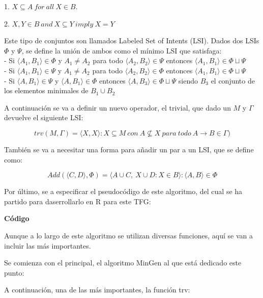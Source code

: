     1. \(X \subseteq A ~ for ~ all ~ X \in B\).

    2. \(X,Y \in B ~ and ~ X \subseteq Y ~ imply ~ X = Y\)

    Este tipo de conjuntos son llamados Labeled Set of Intents (LSI). Dados dos LSIs \(\Phi\) y \(\Psi\), se define la uni\'on de ambos como 
    el m\'inimo LSI que satisfaga:
    \\
    - Si \( \langle A_{1}, B_{1} \rangle \in \Phi \) y \(A_{1} \neq A_{2} \) para todo \( \langle A_{2}, B_{2} \rangle \in \Psi \) 
    entonces \( \langle A_{1}, B_{1} \rangle \in \Phi \sqcup \Psi \)
    \\
    - Si \( \langle A_{1}, B_{1} \rangle \in \Psi \) y \(A_{1} \neq A_{2} \) para todo \( \langle A_{2}, B_{2} \rangle \in \Phi \) 
    entonces \( \langle A_{1}, B_{1} \rangle \in \Phi \sqcup \Psi \)
    \\
    - Si \( \langle A, B_{1} \rangle \in \Psi \) y \( \langle A, B_{1} \rangle \in \Phi \) entonces \( \langle A, B_{3} \rangle \in \Phi \sqcup \Psi \) 
    siendo \(B_{3}\) el conjunto de los elementos minimales de \(B_{1} \cup B_{2}\)

    
    A continuaci\'on se va a definir un nuevo operador, el trivial, que dado un \(M\) y \(\Gamma\) devuelve el siguiente LSI:


    \[
        trv(M, \Gamma) = {\langle X, {X} \rangle: X \subseteq M ~ con ~ A \not \subseteq X ~ para ~ todo ~ A \rightarrow B \in \Gamma} )    
    \]

    Tambi\'en se va a necesitar una forma para a\~nadir un par a un LSI, que se define como:

    \[
        Add(\langle C, {D} \rangle, \Phi) = {\langle A \cup C, ~ {X \cup D: X \in B} \rangle : \langle A, B\rangle \in \Phi}    
    \]


    Por \'ultimo, se a especificar el pseudoc\'odigo de este algoritmo, del cual se ha partido para daserrollarlo en R para este TFG:
    \bigskip

    

    \bigskip
    \textbf{C\'odigo}

    Aunque a lo largo de este algoritmo se utilizan diversas funciones, aqu\'i se van a incluir las m\'as importantes.
    
    Se comienza con el principal, el algoritmo MinGen al que est\'a dedicado este punto:

    

    A continuaci\'on, una de las m\'as importantes, la funci\'on trv:

